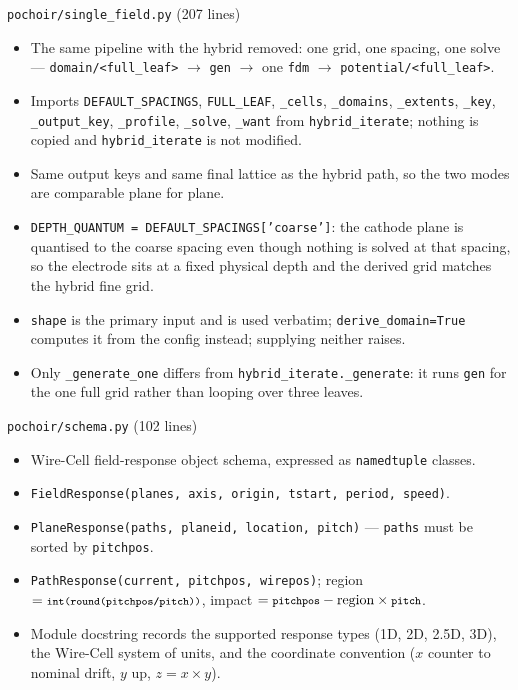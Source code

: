 \documentclass[10pt,aspectratio=169]{beamer}
\newcommand{\ti}[1]{\texttt{\footnotesize #1}}
\begin{document}
\begin{frame}[allowframebreaks]{\texttt{pochoir/single\_field.py} (207 lines)}
  \begin{itemize}\small
  \item The same pipeline with the hybrid removed: one grid, one spacing, one solve ---
        \ti{domain/<full\_leaf>} $\rightarrow$ \ti{gen} $\rightarrow$ one \ti{fdm}
        $\rightarrow$ \ti{potential/<full\_leaf>}.
  \item Imports \ti{DEFAULT\_SPACINGS}, \ti{FULL\_LEAF}, \ti{\_cells}, \ti{\_domains},
        \ti{\_extents}, \ti{\_key}, \ti{\_output\_key}, \ti{\_profile}, \ti{\_solve},
        \ti{\_want} from \ti{hybrid\_iterate}; nothing is copied and
        \ti{hybrid\_iterate} is not modified.
  \item Same output keys and same final lattice as the hybrid path, so the two modes are
        comparable plane for plane.
  \item \ti{DEPTH\_QUANTUM = DEFAULT\_SPACINGS['coarse']}: the cathode plane is quantised to
        the coarse spacing even though nothing is solved at that spacing, so the electrode
        sits at a fixed physical depth and the derived grid matches the hybrid fine grid.
  \item \ti{shape} is the primary input and is used verbatim; \ti{derive\_domain=True}
        computes it from the config instead; supplying neither raises.
  \item Only \ti{\_generate\_one} differs from \ti{hybrid\_iterate.\_generate}: it runs
        \ti{gen} for the one full grid rather than looping over three leaves.
  \end{itemize}
\end{frame}

\begin{frame}{\texttt{pochoir/schema.py} (102 lines)}
  \begin{itemize}\small
  \item Wire-Cell field-response object schema, expressed as \ti{namedtuple} classes.
  \item \ti{FieldResponse(planes, axis, origin, tstart, period, speed)}.
  \item \ti{PlaneResponse(paths, planeid, location, pitch)} --- \ti{paths} must be sorted by
        \ti{pitchpos}.
  \item \ti{PathResponse(current, pitchpos, wirepos)}; region
        $=\ti{int(round(pitchpos/pitch))}$, impact $=\ti{pitchpos}-\text{region}\times\ti{pitch}$.
  \item Module docstring records the supported response types (1D, 2D, 2.5D, 3D), the
        Wire-Cell system of units, and the coordinate convention ($x$ counter to nominal
        drift, $y$ up, $z=x\times y$).
  \end{itemize}
\end{frame}
\end{document}
